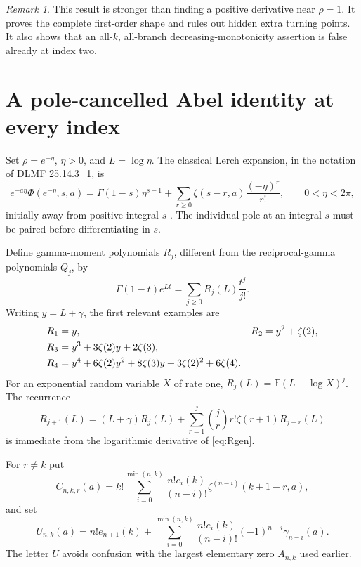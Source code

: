 \documentclass[11pt,letterpaper]{article}
\numberwithin{equation}{section}
\theoremstyle{definition}\newtheorem{definition}[theorem]{Definition}
\theoremstyle{remark}\newtheorem{remark}[theorem]{Remark}
\newcommand{\E}{\mathbb E}\newcommand{\dd}{\,\mathrm d}
\begin{document}
\begin{remark}
This result is stronger than finding a positive derivative near $\rho=1$. It proves the complete first-order shape and rules out hidden extra turning points. It also shows that an all-$k$, all-branch decreasing-monotonicity assertion is false already at index two.
\end{remark}

\section{A pole-cancelled Abel identity at every index}\label{sec:abel}
Set $\rho=e^{-\eta}$, $\eta>0$, and $L=\log\eta$. The classical Lerch expansion, in the notation of DLMF 25.14.3\_1, is
\begin{equation}\label{eq:classical}
 e^{-a\eta}\Phi(e^{-\eta},s,a)
 =\Gamma(1-s)\eta^{s-1}
  +\sum_{r\ge0}\zeta(s-r,a)\frac{(-\eta)^r}{r!},
 \qquad 0<\eta<2\pi,
\end{equation}
initially away from positive integral $s$ \cite{lerch}. The individual pole at an integral $s$ must be paired before differentiating in $s$.

Define gamma-moment polynomials $R_j$, different from the reciprocal-gamma polynomials $Q_j$, by
\begin{equation}\label{eq:Rgen}
 \Gamma(1-t)e^{Lt}=\sum_{j\ge0}R_j(L)\frac{t^j}{j!}.
\end{equation}
Writing $y=L+\gamma$, the first relevant examples are
\begin{align}
 R_1&=y,& R_2&=y^2+\zeta(2),\notag\\
 R_3&=y^3+3\zeta(2)y+2\zeta(3),\label{eq:Rsmall}\\
 R_4&=y^4+6\zeta(2)y^2+8\zeta(3)y+3\zeta(2)^2+6\zeta(4).\notag
\end{align}
For an exponential random variable $X$ of rate one, $R_j(L)=\E(L-\log X)^j$. The recurrence
\begin{equation}\label{eq:Rrec}
 R_{j+1}(L)=(L+\gamma)R_j(L)
 +\sum_{r=1}^j\binom jr r!\zeta(r+1)R_{j-r}(L)
\end{equation}
is immediate from the logarithmic derivative of \eqref{eq:Rgen}.

For $r\ne k$ put
\begin{equation}\label{eq:C}
 C_{n,k,r}(a)=k!\sum_{i=0}^{\min(n,k)}
 \frac{n!e_i(k)}{(n-i)!}\zeta^{(n-i)}(k+1-r,a),
\end{equation}
and set
\begin{equation}\label{eq:A}
 U_{n,k}(a)=n!e_{n+1}(k)
 +\sum_{i=0}^{\min(n,k)}\frac{n!e_i(k)}{(n-i)!}
 (-1)^{n-i}\gamma_{n-i}(a).
\end{equation}
The letter $U$ avoids confusion with the largest elementary zero $A_{n,k}$ used earlier.
\end{document}
